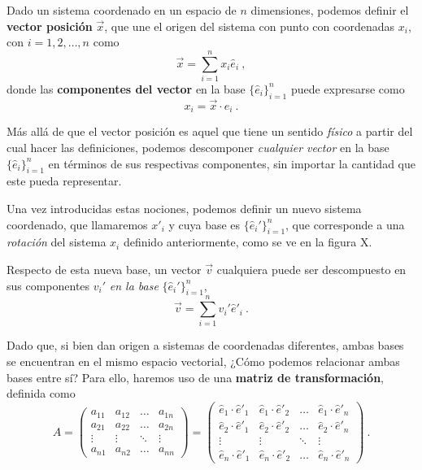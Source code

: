 \begin{defi}
    Dado un sistema coordenado en un espacio de $n$ dimensiones, podemos definir el \textbf{vector posición} $\vec{x}$, que une el origen del sistema con punto con coordenadas $x_i$, con $i = 1, 2, \dots, n$ como
\begin{equation} \label{eq:vector-posicion}
    \vec{x} = \sum_{i=1}^n x_i \hat{e}_i \ ,
\end{equation}
donde las \textbf{componentes del vector} en la base $\{ \hat{e}_i\}_{i=1}^n$ puede expresarse como
\begin{equation}
    x_i = \vec{x} \cdot \hat{e}_i \ .
\end{equation}
\end{defi}

Más allá de que el vector posición es aquel que tiene un sentido \emph{físico} a partir del cual hacer las definiciones, podemos descomponer \emph{cualquier vector} en la base $\{ \hat{e}_i\}_{i=1}^n$ en términos de sus respectivas componentes, sin importar la cantidad que este pueda representar.

Una vez introducidas estas nociones, podemos definir un nuevo sistema coordenado, que llamaremos $x'_i$ y cuya base es $\{ \hat{e}_i'\}_{i=1}^n$, que corresponde a una \emph{rotación} del sistema $x_i$ definido anteriormente, como se ve en la figura X.

Respecto de esta nueva base, un vector $\vec{v}$ cualquiera puede ser descompuesto en sus componentes $v_i'$ \emph{en la base} $\{ \hat{e}_i'\}_{i=1}^n$,
\begin{equation}
    \vec{v} = \sum_{i=1}^n v_i' \hat{e}'_i \ .
\end{equation}

Dado que, si bien dan origen a sistemas de coordenadas diferentes, ambas bases se encuentran en el mismo espacio vectorial, ¿Cómo podemos relacionar ambas bases entre sí? Para ello, haremos uso de una \textbf{matriz de transformación}, definida como
\begin{equation}
    A = \begin{pmatrix}
        a_{11} & a_{12} & \dots & a_{1n} \\
        a_{21} & a_{22} & \dots & a_{2n} \\
        \vdots & \vdots & \ddots & \vdots \\
        a_{n1} & a_{n2} & \dots & a_{nn}
    \end{pmatrix} =
    \begin{pmatrix}
        \hat{e}_1 \cdot \hat{e}'_1 & \hat{e}_1 \cdot \hat{e}'_2 & \dots & \hat{e}_1 \cdot \hat{e}'_n \\
        \hat{e}_2 \cdot \hat{e}'_1 & \hat{e}_2 \cdot \hat{e}'_2 & \dots & \hat{e}_2 \cdot \hat{e}'_n \\
        \vdots & \vdots & \ddots & \vdots \\
        \hat{e}_n \cdot \hat{e}'_1 & \hat{e}_n \cdot \hat{e}'_2 & \dots & \hat{e}_n \cdot \hat{e}'_n
    \end{pmatrix} \ .
\end{equation}

